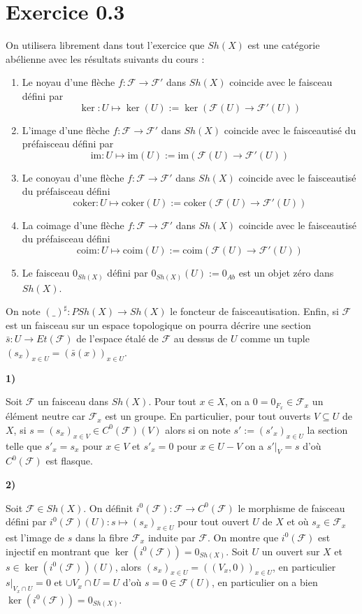 \documentclass[a4paper,12pt]{article}
\newcommand{\F}{\mathscr F}
\newcommand{\im}{\textrm{im}}
\newcommand{\coker}{\textrm{coker}}
\newcommand{\coim}{\textrm{coim}}
\theoremstyle{plain}
\theoremstyle{definition}
\theoremstyle{remark}
\begin{document}
\section*{Exercice 0.3}
On utilisera librement dans tout l'exercice que $Sh(X)$ est une
catégorie abélienne avec les résultats suivants du cours : 
\begin{enumerate}
	\item Le noyau d'une flèche $f\colon \F\to \F'$ dans $Sh(X)$
		coincide avec le faisceau défini par 
		\[\ker\colon U\mapsto \ker(U):=\ker(\F(U)\to\F'(U))\]
	\item L'image d'une flèche $f\colon \F\to \F'$ dans $Sh(X)$
		coincide avec le faisceautisé du préfaisceau défini
		par
		\[\im\colon U\mapsto \im(U):=\im(\F(U)\to\F'(U))\]
	\item Le conoyau d'une flèche $f\colon \F\to \F'$ dans $Sh(X)$
		coincide avec le faisceautisé du préfaisceau défini
		\[\coker\colon U\mapsto \coker(U):=\coker(\F(U)\to\F'(U))\]
	\item La coimage d'une flèche $f\colon \F\to \F'$ dans $Sh(X)$
		coincide avec le faisceautisé du préfaisceau défini
		\[\coim\colon U\mapsto \coim(U):=\coim(\F(U)\to\F'(U))\]
	\item Le faisceau $0_{Sh(X)}$ défini par $0_{Sh(X)}(U):= 0_{Ab}$
		est un objet zéro dans $Sh(X)$.
\end{enumerate}
On note $(\_)^\sharp\colon PSh(X)\to Sh(X)$ le foncteur de 
faisceautisation. Enfin, si $\F$ est un faisceau sur un espace 
topologique on pourra décrire une section $\bar s\colon U\to Et(\F)$ 
de l'espace étalé de $\F$ au dessus de $U$ comme un tuple 
$(s_x)_{x\in U}=(\bar s(x))_{x\in U}$.

\begin{center}
	\textbf{1)}
\end{center}
Soit $\F$ un faisceau dans $Sh(X)$. Pour tout $x\in X$, on a 
$0=0_{F_x}\in \F_x$ un élément neutre car
$\F_x$ est un groupe. En particulier, pour tout ouverts 
$V\subseteq U$ de $X$, si $s=(s_x)_{x\in V}\in C^0(\F)(V)$ alors
si on note $s':=(s'_x)_{x\in U}$ la section telle que $s'_x=s_x$ pour
$x\in V$ et $s'_x=0$ pour $x\in U-V$ on a $s'|_V=s$ d'où $C^0(\F)$
est flasque.

\begin{center}
	\textbf{2)}
\end{center}
Soit $\F\in Sh(X)$. On définit $i^0(\F)\colon \F\to C^0(\F)$ le
morphisme de faisceau défini par 
$i^0(\F)(U)\colon s\mapsto (s_x)_{x\in U}$ pour tout ouvert $U$ de $X$
et où $s_x\in \F_x$ est 
l'image de $s$ dans la fibre $\F_x$ induite par $\F$. On montre que
$i^0(\F)$ est injectif en montrant que $\ker(i^0(\F))=0_{Sh(X)}$. 
Soit $U$ un ouvert sur $X$ et $s\in \ker(i^0(\F))(U)$, alors 
$(s_x)_{x\in U}=((V_x, 0))_{x\in U}$, en particulier $s|_{V_x\cap U}=0$ 
et $\cup V_x\cap U = U$ d'où $s=0\in \F(U)$, en particulier on a bien 
$\ker(i^0(\F))=0_{Sh(X)}$.
\end{document}
